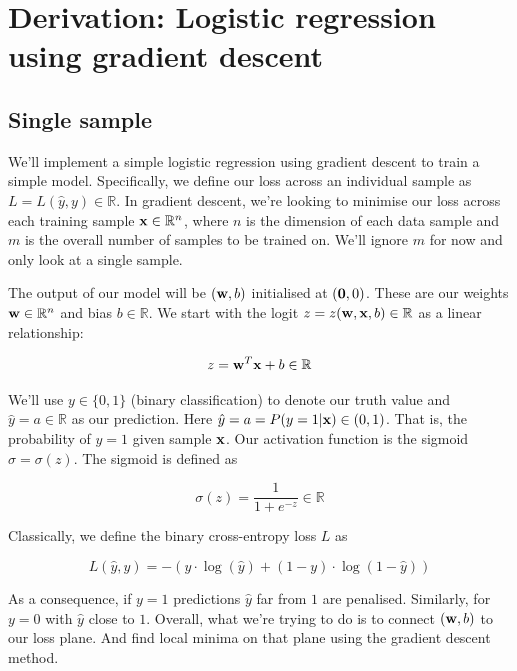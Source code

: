 \documentclass[a4paper]{article}
\begin{document}
\section{Derivation: Logistic regression using gradient descent}
\subsection{Single sample}
We'll implement a simple logistic regression using gradient descent to train a simple model. Specifically, we define our loss across an individual sample as $L=L(\hat{y},y) \in \mathbb{R}$. In gradient descent, we're looking to minimise our loss across each training sample $\bold x\in\mathbb{R}^{n}$, where $n$ is the dimension of each data sample and $m$ is the overall number of samples to be trained on. We'll ignore $m$ for now and only look at a single sample.

The output of our model will be $(\bold w,b)$ initialised at $(\bold 0, 0)$. These are our weights $\bold w\in\mathbb{R}^n$ and bias $b\in\mathbb{R}$. We start with the logit $z=z(\bold w,\bold x,b) \in \mathbb{R}$ as a linear relationship:

\begin{equation}
z=\bold w ^T\bold x + b \in \mathbb{R}
\end{equation}

We'll use $y \in \{0,1\}$ (binary classification) to denote our truth value and $\hat{y} = a \in \mathbb{R}$ as our prediction. Here $\hat y = a = P(y=1|\bold x) \in (0, 1)$. That is, the probability of $y = 1$ given sample $\bold x$. Our activation function is the sigmoid $\sigma=\sigma(z)$. The sigmoid is defined as

\begin{equation}
\sigma(z) = \frac{1}{1 + e^{-z}} \in \mathbb{R}
\end{equation}

Classically, we define the binary cross-entropy loss $L$ as

\begin{equation}
L(\hat y, y) = -\left(y \cdot \log(\hat y) + (1-y) \cdot \log(1-\hat y)\right)
\end{equation}

As a consequence, if $y=1$ predictions $\hat y$ far from $1$ are penalised. Similarly, for $y=0$ with $\hat y$ close to $1$. Overall, what we're trying to do is to connect $(\bold w, b)$ to our loss plane. And find local minima on that plane using the gradient descent method.
\end{document}
